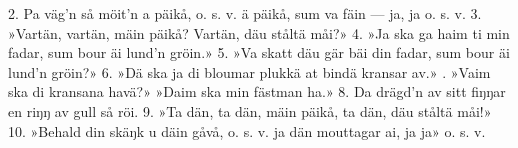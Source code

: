 \setlength{\columnsep}{0.5cm}
\begin{multicols}{2}
2.  Pa väg’n så möit’n a päikå, o. s. v.
    ä päikå, sum va fäin — ja, ja o. s. v.
3.  »Vartän, vartän, mäin päikå?
    Vartän, däu ståltä måi?»
4.  »Ja ska ga haim ti min fadar,
    sum bour äi lund’n gröin.»
5.  »Va skatt däu gär bäi din fadar,
    sum bour äi lund’n gröin?»
6.  »Dä ska ja di bloumar plukkä
    at bindä kransar av.»
\vfill{}.  »Vaim ska di kransana havä?»
    »Daim ska min fästman ha.»
8.  Da drägd’n av sitt fiŋŋar
    en riŋŋ av gull så röi.
9.  »Ta dän, ta dän, mäin päikå,
    ta dän, däu ståltä måi!»
10. »Behald din skäŋk u däin gåvå, o. s. v.
    ja dän mouttagar ai, ja ja» o. s. v.
\end{multicols}
